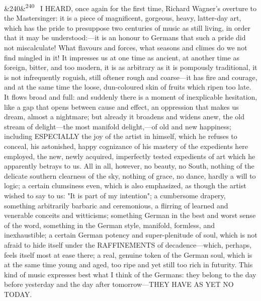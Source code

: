 \documentclass[12pt]{article}
\newcommand{\para}[1][]{\par\noindent\ifx&#1&\else\textsuperscript{\footnotesize #1}~\fi}
\begin{document}
\para[240] I HEARD, once again for the first time, Richard Wagner's overture to the Mastersinger: it is a piece of magnificent, gorgeous, heavy, latter-day art, which has the pride to presuppose two centuries of music as still living, in order that it may be understood:---it is an honour to Germans that such a pride did not miscalculate! What flavours and forces, what seasons and climes do we not find mingled in it! It impresses us at one time as ancient, at another time as foreign, bitter, and too modern, it is as arbitrary as it is pompously traditional, it is not infrequently roguish, still oftener rough and coarse---it has fire and courage, and at the same time the loose, dun-coloured skin of fruits which ripen too late. It flows broad and full: and suddenly there is a moment of inexplicable hesitation, like a gap that opens between cause and effect, an oppression that makes us dream, almost a nightmare; but already it broadens and widens anew, the old stream of delight---the most manifold delight,---of old and new happiness; including ESPECIALLY the joy of the artist in himself, which he refuses to conceal, his astonished, happy cognizance of his mastery of the expedients here employed, the new, newly acquired, imperfectly tested expedients of art which he apparently betrays to us. All in all, however, no beauty, no South, nothing of the delicate southern clearness of the sky, nothing of grace, no dance, hardly a will to logic; a certain clumsiness even, which is also emphasized, as though the artist wished to say to us: "It is part of my intention"; a cumbersome drapery, something arbitrarily barbaric and ceremonious, a flirring of learned and venerable conceits and witticisms; something German in the best and worst sense of the word, something in the German style, manifold, formless, and inexhaustible; a certain German potency and super-plenitude of soul, which is not afraid to hide itself under the RAFFINEMENTS of decadence---which, perhaps, feels itself most at ease there; a real, genuine token of the German soul, which is at the same time young and aged, too ripe and yet still too rich in futurity. This kind of music expresses best what I think of the Germans: they belong to the day before yesterday and the day after tomorrow---THEY HAVE AS YET NO TODAY.
\end{document}

